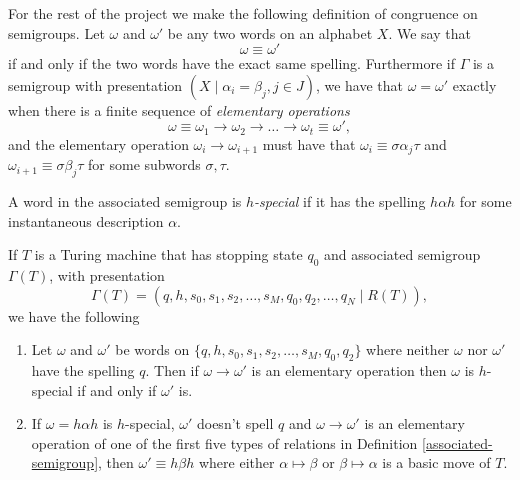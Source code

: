 For the rest of the project we make the following definition of congruence on semigroups. Let $\omega$ and $\omega'$ be any two words on an alphabet $X$. We say that 
\begin{equation*}
  \omega \equiv \omega'
\end{equation*}
if and only if the two words have the exact same spelling. Furthermore if $\Gamma$ is a semigroup with presentation $(X \mid \alpha_i = \beta_j,j \in J )$, we have that $\omega = \omega'$ exactly when there is a finite sequence of \emph{elementary operations}
\begin{equation*}
  \omega \equiv \omega_1 \rightarrow \omega_2 \rightarrow \dots \rightarrow \omega_t \equiv \omega',
\end{equation*}
and the elementary operation $\omega_i \rightarrow \omega_{i+1}$ must have that $\omega_i \equiv \sigma\alpha_j\tau$ and $\omega_{i+1} \equiv \sigma\beta_j\tau$ for some subwords $\sigma,\tau$.

\begin{definition}
  A word in the associated semigroup is \emph{$h$-special} if it has the spelling $h\alpha h$ for some  instantaneous description $\alpha$.
\end{definition}


\begin{lemma}
  \label{lem:gamma-prop}
  If $T$ is a Turing machine that has stopping state $q_0$ and associated semigroup $\Gamma(T)$, with presentation
  \begin{equation*}
    \Gamma(T) = (q,h,s_0,s_1,s_2, \dots, s_M, q_0,q_2, \dots, q_N \mid R(T)), 
  \end{equation*}
  we have the following
  \begin{enumerate}
  \item Let $\omega$ and $\omega'$ be words on $\{q,h,s_0,s_1,s_2, \dots, s_M, q_0,q_2\}$ where neither $\omega$ nor $\omega'$ have the spelling $q$. Then if $\omega \rightarrow \omega'$ is an elementary operation then $\omega$ is $h$-special if and only if $\omega'$ is.
  \item If $\omega = h\alpha h$ is $h$-special, $\omega'$ doesn't spell $q$ and $\omega \rightarrow \omega'$ is an elementary operation of one of the first five types of relations in Definition \ref{associated-semigroup}, then $\omega' \equiv h\beta h$  where either $\alpha \mapsto \beta$ or $\beta \mapsto \alpha$ is a basic move of $T$.
  \end{enumerate}
\end{lemma}

